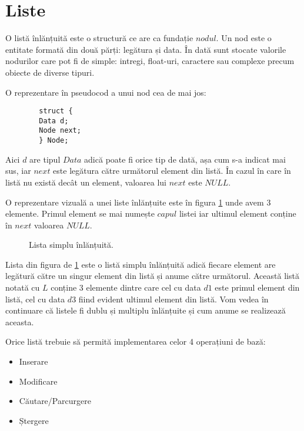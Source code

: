 \section{Liste}

O listă înlănțuită este o structură ce are ca fundație $nodul$. Un nod este o entitate formată din două părți: legătura și data. În dată sunt stocate valorile nodurilor care pot fi de simple: intregi, float-uri, caractere sau complexe precum obiecte de diverse tipuri.

O reprezentare în pseudocod a unui nod cea de mai jos:

		\begin{lstlisting}
		struct {
		Data d;
		Node next;
		} Node;
		\end{lstlisting}		

Aici $d$ are tipul $Data$ adică poate fi orice tip de dată, așa cum s-a indicat mai sus, iar $next$ este legătura către următorul element din listă. În cazul în care în listă nu există decât un element, valoarea lui $next$ este $NULL$.

O reprezentare vizuală a unei liste înlănțuite este în figura \ref{fig:linkedlist} unde avem 3 elemente. Primul element se mai numește $capul$ listei iar ultimul element conține în $next$ valoarea $NULL$.

\begin{figure}[H] 
	\centering	
	{
	}
	\caption{Lista simplu înlănțuită.} 
	\label{fig:linkedlist}
\end{figure}


Lista din figura de \ref{fig:linkedlist} este o listă simplu înlănțuită adică fiecare element are legătură către un singur element din listă și anume către următorul. Această listă notată cu $L$ conține 3 elemente dintre care cel cu data $d1$ este primul element din listă, cel cu data $d3$ fiind evident ultimul element din listă.
Vom vedea în continuare că listele fi dublu și multiplu înlănțuite și cum anume se realizează aceasta.

Orice listă trebuie să permită implementarea celor 4 operațiuni de bază:

\begin{itemize}
\item {Inserare}
\item {Modificare}
\item {Căutare/Parcurgere}
\item {Ștergere}
\end{itemize}

